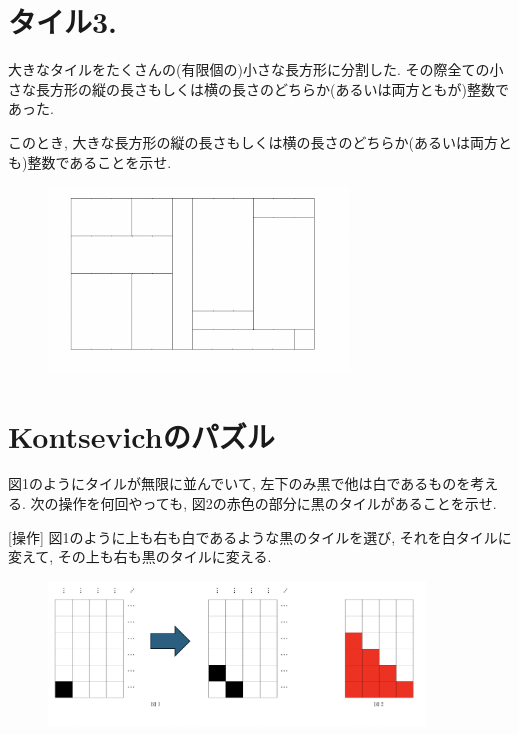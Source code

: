\documentclass[dvipdfmx,a4paper,12pt]{article} %
\theoremstyle{definition}
\theoremstyle{remark}
\numberwithin{equation}{section}
\begin{document}
\section{タイル3. }
大きなタイルをたくさんの(有限個の)小さな長方形に分割した. 
その際全ての小さな長方形の縦の長さもしくは横の長さのどちらか(あるいは両方ともが)整数であった.

\vspace{5pt}
このとき, 大きな長方形の縦の長さもしくは横の長さのどちらか(あるいは両方とも)整数であることを示せ.
\begin{figure}[htbp]
\begin{center}
\includegraphics[width=80mm]{tile3.png}
\end{center}
\end{figure}





\section{Kontsevichのパズル}
図1のようにタイルが無限に並んでいて, 左下のみ黒で他は白であるものを考える.
次の操作を何回やっても, 図2の赤色の部分に黒のタイルがあることを示せ. 

\vspace{5pt}
[操作] 図1のように上も右も白であるような黒のタイルを選び, それを白タイルに変えて, その上も右も黒のタイルに変える.

\begin{figure}[htbp]
\begin{center}
\includegraphics[width=100mm]{kont.png}
\end{center}
\end{figure}
\end{document}
